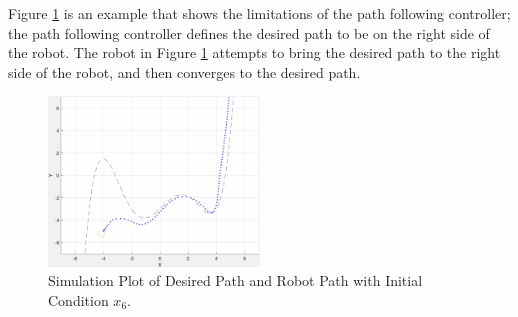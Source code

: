 \documentclass[11pt, letterpaper]{article}
\numberwithin{equation}{section}
\begin{document}
\pagebreak

Figure \ref{fig:sim_rgt_pth} is an example that shows the limitations of the path following controller; the path following controller defines the desired path to be on the right side of the robot. The robot in Figure \ref{fig:sim_rgt_pth} attempts to bring the desired path to the right side of the robot, and then converges to the desired path.

\begin{figure}[H]
	\begin{center}
		\includegraphics[height=0.3\textheight, width=0.5\textwidth]{images/sim_rgt_pth.png}
		\caption{Simulation Plot of Desired Path and Robot Path with Initial Condition $x_6$.}
		\label{fig:sim_rgt_pth}
	\end{center}
\end{figure}
\end{document}
